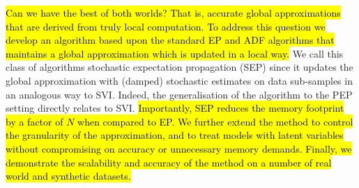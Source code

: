 \hl{Can we have the best of both worlds? That is, accurate global approximations that are derived from truly local computation. To address this question we develop an algorithm based upon the standard EP and ADF algorithms that maintains a global approximation which is updated in a local way.}
%
We call this class of algorithms stochastic expectation propagation (SEP) since it updates the global approximation with (damped) stochastic estimates on data sub-samples in an analogous way to SVI. Indeed, the generalisation of the algorithm to the PEP setting directly relates to SVI. 
%
\hl{Importantly, SEP reduces the memory footprint by a factor of $N$ when compared to EP. We further extend the method to control the granularity of the approximation, and to treat models with latent variables without compromising on accuracy or unnecessary memory demands. Finally, we demonstrate the scalability and accuracy of the method on a number of real world and synthetic datasets.}



